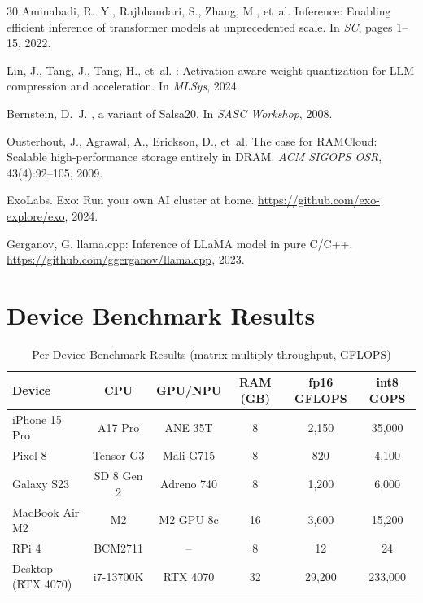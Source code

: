 \documentclass[11pt,a4paper]{article}
\begin{document}
\begin{thebibliography}{30}
Aminabadi, R.~Y., Rajbhandari, S., Zhang, M., et~al.
 Inference: Enabling efficient inference of transformer models at unprecedented scale.
\newblock In \emph{SC}, pages 1--15, 2022.

Lin, J., Tang, J., Tang, H., et~al.
: Activation-aware weight quantization for {LLM} compression and acceleration.
\newblock In \emph{MLSys}, 2024.

Bernstein, D.~J.
, a variant of {Salsa20}.
\newblock In \emph{SASC Workshop}, 2008.

Ousterhout, J., Agrawal, A., Erickson, D., et~al.
\newblock The case for {RAMCloud}: Scalable high-performance storage entirely in {DRAM}.
\newblock \emph{ACM SIGOPS OSR}, 43(4):92--105, 2009.

ExoLabs.
\newblock Exo: Run your own AI cluster at home.
\newblock \url{https://github.com/exo-explore/exo}, 2024.

Gerganov, G.
\newblock llama.cpp: Inference of {LLaMA} model in pure {C/C++}.
\newblock \url{https://github.com/ggerganov/llama.cpp}, 2023.

\end{thebibliography}

\appendix

\section{Device Benchmark Results}

\begin{table}[H]
\centering
\caption{Per-Device Benchmark Results (matrix multiply throughput, GFLOPS)}
\label{tab:device-benchmark}
\begin{tabular}{lccccc}
\toprule
\textbf{Device} & \textbf{CPU} & \textbf{GPU/NPU} & \textbf{RAM (GB)} & \textbf{fp16 GFLOPS} & \textbf{int8 GOPS} \\
\midrule
iPhone 15 Pro & A17 Pro & ANE 35T & 8 & 2{,}150 & 35{,}000 \\
Pixel 8 & Tensor G3 & Mali-G715 & 8 & 820 & 4{,}100 \\
Galaxy S23 & SD 8 Gen 2 & Adreno 740 & 8 & 1{,}200 & 6{,}000 \\
MacBook Air M2 & M2 & M2 GPU 8c & 16 & 3{,}600 & 15{,}200 \\
RPi 4 & BCM2711 & -- & 8 & 12 & 24 \\
Desktop (RTX 4070) & i7-13700K & RTX 4070 & 32 & 29{,}200 & 233{,}000 \\
\bottomrule
\end{tabular}
\end{table}
\end{document}
